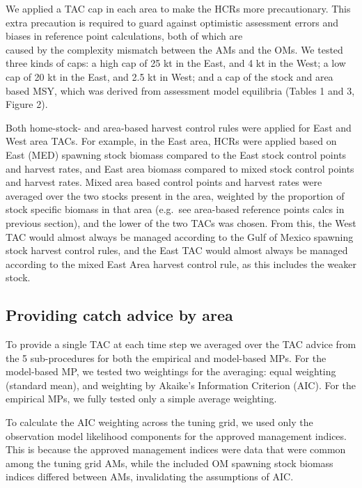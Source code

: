 \documentclass[]{article}
\begin{document}
We applied a TAC cap in each area to make the HCRs more precautionary. This
extra precaution is required to guard against optimistic assessment errors
and biases in reference point calculations, both of which are\\
caused by the complexity mismatch between the AMs and the OMs. We tested
three kinds of caps: a high cap of 25 kt in the East, and 4 kt in the West;
a low cap of 20 kt in the East, and 2.5 kt in West; and a cap of the
stock and area based MSY, which was derived from assessment model
equilibria (Tables 1 and 3, Figure 2).

Both home-stock- and area-based harvest control rules were applied for
East and West area TACs. For example, in the East area, HCRs were applied
based on East (MED) spawning stock biomass compared to the East stock
control points and harvest rates, and East area biomass compared to mixed
stock control points and harvest rates. Mixed area based control points
and harvest rates were averaged over the two stocks present in the area,
weighted by the proportion of stock specific biomass in that area
(e.g.~see area-based reference points calcs in previous section), and
the lower of the two TACs was chosen. From this, the West TAC would almost
always be managed according to the Gulf of Mexico spawning stock harvest
control rules, and the East TAC would almost always be managed according
to the mixed East Area harvest control rule, as this includes the weaker
stock.

\hypertarget{providing-catch-advice-by-area}{%
\subsection{Providing catch advice by area}\label{providing-catch-advice-by-area}}

To provide a single TAC at each time step we averaged over the TAC
advice from the 5 sub-procedures for both the empirical and
model-based MPs. For the model-based MP, we tested two weightings
for the averaging: equal weighting (standard mean), and weighting
by Akaike's Information Criterion (AIC). For the empirical MPs,
we fully tested only a simple average weighting.

To calculate the AIC weighting across the tuning grid, we used only
the observation model likelihood components for the approved management
indices. This is because the approved management indices were data
that were common among the tuning grid AMs, while the included OM
spawning stock biomass indices differed between AMs, invalidating
the assumptions of AIC.
\end{document}
